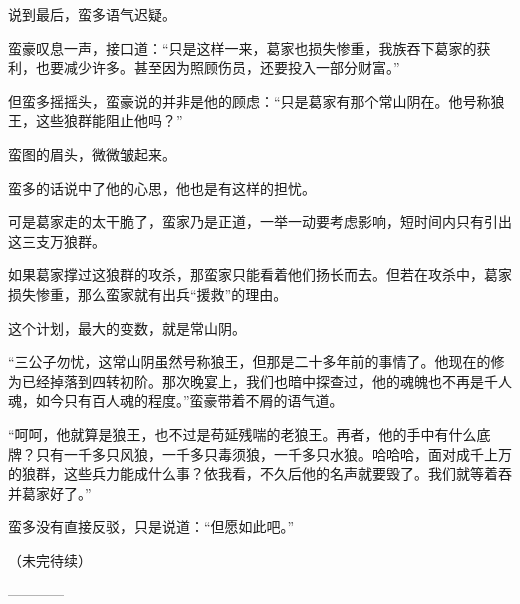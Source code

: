 \begin{this_body}
说到最后，蛮多语气迟疑。

蛮豪叹息一声，接口道：“只是这样一来，葛家也损失惨重，我族吞下葛家的获利，也要减少许多。甚至因为照顾伤员，还要投入一部分财富。”

但蛮多摇摇头，蛮豪说的并非是他的顾虑：“只是葛家有那个常山阴在。他号称狼王，这些狼群能阻止他吗？”

蛮图的眉头，微微皱起来。

蛮多的话说中了他的心思，他也是有这样的担忧。

可是葛家走的太干脆了，蛮家乃是正道，一举一动要考虑影响，短时间内只有引出这三支万狼群。

如果葛家撑过这狼群的攻杀，那蛮家只能看着他们扬长而去。但若在攻杀中，葛家损失惨重，那么蛮家就有出兵“援救”的理由。

这个计划，最大的变数，就是常山阴。

“三公子勿忧，这常山阴虽然号称狼王，但那是二十多年前的事情了。他现在的修为已经掉落到四转初阶。那次晚宴上，我们也暗中探查过，他的魂魄也不再是千人魂，如今只有百人魂的程度。”蛮豪带着不屑的语气道。

“呵呵，他就算是狼王，也不过是苟延残喘的老狼王。再者，他的手中有什么底牌？只有一千多只风狼，一千多只毒须狼，一千多只水狼。哈哈哈，面对成千上万的狼群，这些兵力能成什么事？依我看，不久后他的名声就要毁了。我们就等着吞并葛家好了。”

蛮多没有直接反驳，只是说道：“但愿如此吧。”

（未完待续）

------------

\end{this_body}

